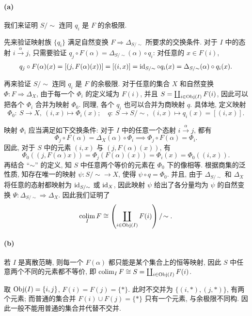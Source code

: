 \documentclass{article}
\begin{document}
\begin{solution}
	\paragraph{(a)} 我们来证明 $S/\sim$ 连同 $q_i$ 是 $F$ 的余极限. 

	先来验证映射族 $\{q_i\}$ 满足自然变换 $F \Rightarrow \Delta_{S/\sim}$ 所要求的交换条件. 对于 $I$ 中的态射 $i \xrightarrow{\alpha} j$, 只需要验证 $q_j \circ F(\alpha) = \Delta_{S/\sim}(\alpha) \circ q_i$: 对任意的 $x \in F(i)$, 
	\[ q_j \circ F(\alpha) (x) = [(j, F(\alpha)(x))] = [(i,x)] = \operatorname{id}_{S/\sim} \circ q_i(x) = \Delta_{S/\sim}(\alpha) \circ q_i (x). \]

	再来验证 $S/\sim$ 连同 $q_i$ 是 $F$ 的余极限. 对于任意的集合 $X$ 和自然变换 $\Phi: F \Rightarrow \Delta_X$, 	由于每一个 $\Phi_i$ 的定义域为 $F(i)$, 并且 $S = \coprod_{i \in \operatorname{Obj}(I)} F(i)$, 因此可以把各个 $\Phi_i$ 合并为映射 $\Phi_0$. 同理, 各个 $q_i$ 也可以合并为商映射 $q$. 具体地, 定义映射
	\[ \Phi_0:\ S \to X,\ (i, x) \mapsto \Phi_i(x); \quad 
	q:\ S \to S/\!\sim,\ (i, x) \mapsto q_i(x) = [(i, x)]. \]

	映射 $\Phi_i$ 应当满足如下交换条件: 对于 $I$ 中的任意一个态射 $i \xrightarrow{\alpha} j$, 都有
	\[ \Phi_j \circ F(\alpha) = \Delta_X(\alpha) \circ \Phi_i 
	\implies \Phi_j \circ F(\alpha) = \Phi_i. \]
	因此, 对于 $S$ 中的元素 $(i, x)$ 与 $(j, F(\alpha)(x))$, 有
	\[ \Phi_0((j, F(\alpha)x)) = \Phi_j(F(\alpha)(x)) = \Phi_i (x) = \Phi_0((i, x)). \]
	再结合 ``$\sim$'' 的定义, 知 $S$ 中任意两个等价的元素在 $\Phi_0$ 下的像相等. 根据商集的泛性质, 知存在唯一的映射 $\psi: S/\sim \to X$, 使得 $\psi \circ q = \Phi_0$. 并且, 由于 $\Delta_{S/\sim}$ 和 $\Delta_X$ 将任意的态射都映射为 $\operatorname{id}_{S/\sim}$ 或 $\operatorname{id}_X$, 因此映射 $\psi$ 给出了各分量均为 $\psi$ 的自然变换 $\Psi: \Delta_{S/\sim} \Rightarrow \Delta_X$. 因此我们证明了
	\[ \operatorname*{colim}_{I}F \cong \left( \coprod_{i \in \operatorname{Obj}(I)}^{}F(i) \right)/\!\sim . \]

	\paragraph{(b)} 若 $I$ 是离散范畴, 则每一个 $F(\alpha)$ 都只能是某个集合上的恒等映射, 因此 $S$ 中任意两个不同的元素都不等价, 即 $\operatorname*{colim}_{I}F \cong S = \coprod_{i \in \operatorname{Obj}(I)} F(i)$. 

	取 $\operatorname{Obj}(I) = \{i, j\}$, $F(i) = F(j) = \{*\}$. 此时不交并为 $\{(i, *), (j, *)\}$, 有两个元素; 而普通的集合并 $F(i) \cup F(j) = \{*\}$ 只有一个元素, 与余极限不同构. 因此一般不能用普通的集合并代替不交并.


\end{solution}
\end{document}
